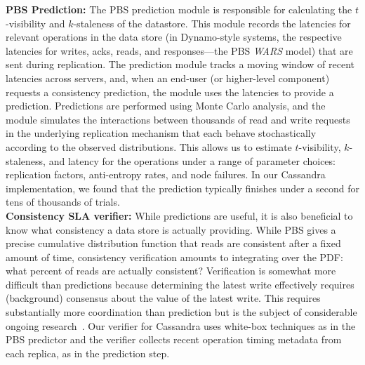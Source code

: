 \textbf{PBS Prediction:} The PBS prediction module is responsible for
calculating the $t$-visibility and $k$-staleness of the
datastore. This module records the latencies for relevant operations
in the data store (in Dynamo-style systems, the respective latencies
for writes, acks, reads, and responses---the PBS \textit{WARS} model)
that are sent during replication.  The prediction module tracks a
moving window of recent latencies across servers, and, when an
end-user (or higher-level component) requests a consistency
prediction, the module uses the latencies to provide a
prediction. Predictions are performed using Monte Carlo analysis, and
the module simulates the interactions between thousands of read and
write requests in the underlying replication mechanism that each
behave stochastically according to the observed distributions. This
allows us to estimate $t$-visibility, $k$-staleness, and latency for
the operations under a range of parameter choices: replication
factors, anti-entropy rates, and node failures. In our Cassandra
implementation, we found that the prediction typically finishes under
a second for tens of thousands of trials.\\



\textbf{Consistency SLA verifier:} While predictions are useful, it is
also beneficial to know what consistency a data store is actually
providing. While PBS gives a precise cumulative distribution function
that reads are consistent after a fixed amount of time, consistency
verification amounts to integrating over the PDF: what percent of
reads are actually consistent? Verification is somewhat more difficult
than predictions because determining the latest write effectively
requires (background) consensus about the value of the latest
write. This requires substantially more coordination than prediction
but is the subject of considerable ongoing
research~\cite{hotdep}. Our verifier for Cassandra uses white-box
techniques as in the PBS predictor and the verifier collects recent
operation timing metadata from each replica, as in the prediction step.

